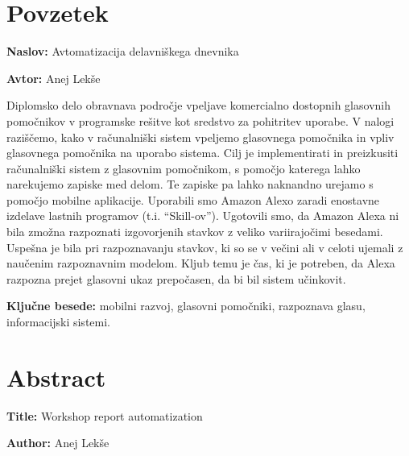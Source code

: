 \documentclass[a4paper, 12pt]{book}
\newcommand{\ttitle}{Avtomatizacija delavniškega dnevnika}
\newcommand{\ttitleEn}{Workshop report automatization}
\newcommand{\tauthor}{Anej Lekše}
\newcommand{\tkeywords}{mobilni razvoj, glasovni pomočniki, razpoznava glasu, informacijski sistemi}
\newcommand{\clearemptydoublepage}{\newpage{\pagestyle{empty}\cleardoublepage}}
\begin{document}
\chapter*{Povzetek}

\noindent\textbf{Naslov:} \ttitle
\bigskip

\noindent\textbf{Avtor:} \tauthor
\bigskip


\noindent Diplomsko delo obravnava področje vpeljave komercialno dostopnih glasovnih pomočnikov v programske rešitve kot sredstvo za pohitritev uporabe.
V nalogi raziščemo, kako v računalniški sistem vpeljemo glasovnega pomočnika in vpliv glasovnega pomočnika na uporabo sistema.
Cilj je implementirati in preizkusiti računalniški sistem z glasovnim pomočnikom, s pomočjo katerega lahko narekujemo zapiske med delom. 
Te zapiske pa lahko naknandno urejamo s pomočjo mobilne aplikacije.
Uporabili smo Amazon Alexo zaradi enostavne izdelave lastnih programov (t.i. \enquote{Skill-ov}).
Ugotovili smo, da Amazon Alexa ni bila zmožna razpoznati izgovorjenih stavkov z veliko variirajočimi besedami.
Uspešna je bila pri razpoznavanju stavkov, ki so se v večini ali v celoti ujemali z naučenim razpoznavnim modelom.
Kljub temu je čas, ki je potreben, da Alexa razpozna prejet glasovni ukaz prepočasen, da bi bil sistem učinkovit.
\bigskip

\noindent\textbf{Ključne besede:} \tkeywords.
\clearemptydoublepage

\chapter*{Abstract}

\noindent\textbf{Title:} \ttitleEn
\bigskip

\noindent\textbf{Author:} \tauthor
\bigskip
\end{document}
